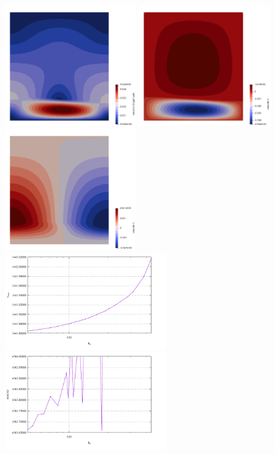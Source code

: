 \begin{center}
\includegraphics[width=5.7cm]{python_codes/fieldstone_25/results/001_100/vel}
\includegraphics[width=5.7cm]{python_codes/fieldstone_25/results/001_100/u}
\includegraphics[width=5.7cm]{python_codes/fieldstone_25/results/001_100/v}\\
\includegraphics[width=7cm]{python_codes/fieldstone_25/results/vrms_001.pdf}
\includegraphics[width=7cm]{python_codes/fieldstone_25/results/max_vel_001.pdf}\\

\end{center}

